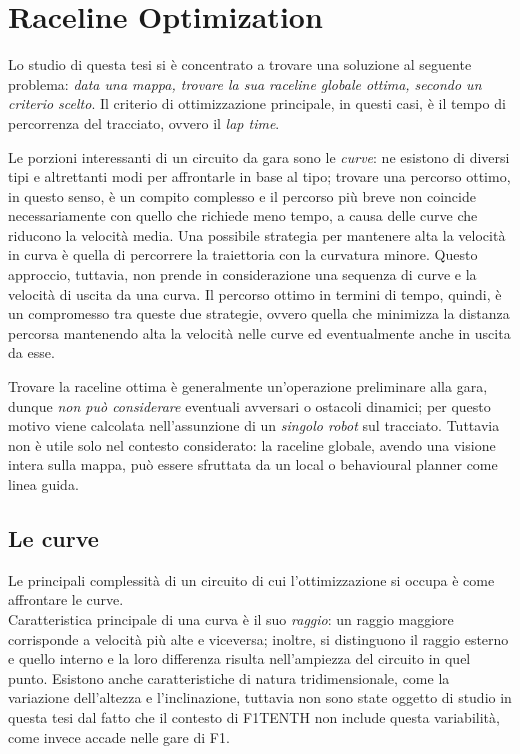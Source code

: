 
\chapter{Raceline Optimization}
\label{chap:opt}

Lo studio di questa tesi si è concentrato a trovare una soluzione al seguente problema: \textit{data una
mappa, trovare la sua raceline globale ottima, secondo un criterio scelto}. Il
criterio di ottimizzazione principale, in questi casi, è il tempo di percorrenza del tracciato, ovvero il
\textit{lap time}.

Le porzioni interessanti di un circuito da gara sono le \textit{curve}: ne esistono di diversi tipi e
altrettanti modi per affrontarle in base al tipo; trovare una percorso ottimo, in questo senso, è un
compito complesso e il percorso più breve non coincide necessariamente con quello che richiede meno
tempo, a causa delle curve che riducono la velocità media. Una possibile strategia per mantenere alta la
velocità in curva è quella di percorrere la traiettoria con la curvatura minore. Questo approccio,
tuttavia, non prende in considerazione una sequenza di curve e la velocità di uscita da una curva. Il
percorso ottimo in termini di tempo, quindi, è un compromesso tra queste due strategie, ovvero quella che
minimizza la distanza percorsa mantenendo alta la velocità nelle curve ed eventualmente anche in uscita
da esse.

Trovare la raceline ottima è generalmente un'operazione preliminare alla gara, dunque \textit{non può
considerare} eventuali avversari o ostacoli dinamici; per questo motivo viene calcolata nell'assunzione
di un \textit{singolo robot} sul tracciato.
Tuttavia non è utile solo nel contesto considerato: la raceline globale, avendo una visione intera sulla
mappa, può essere sfruttata da un local o behavioural planner come linea guida.

\section{Le curve}
Le principali complessità di un circuito di cui l'ottimizzazione si occupa è come affrontare le curve.\\
Caratteristica principale di una curva è il suo \textit{raggio}: un raggio maggiore corrisponde a
velocità più alte e viceversa; inoltre, si distinguono il raggio esterno e quello interno e la loro
differenza risulta nell'ampiezza del circuito in quel punto.
Esistono anche caratteristiche di natura tridimensionale, come la variazione dell'altezza e
l'inclinazione, tuttavia non sono state oggetto di studio in questa tesi dal fatto che il contesto di
F1TENTH non include questa variabilità, come invece accade nelle gare di F1.

